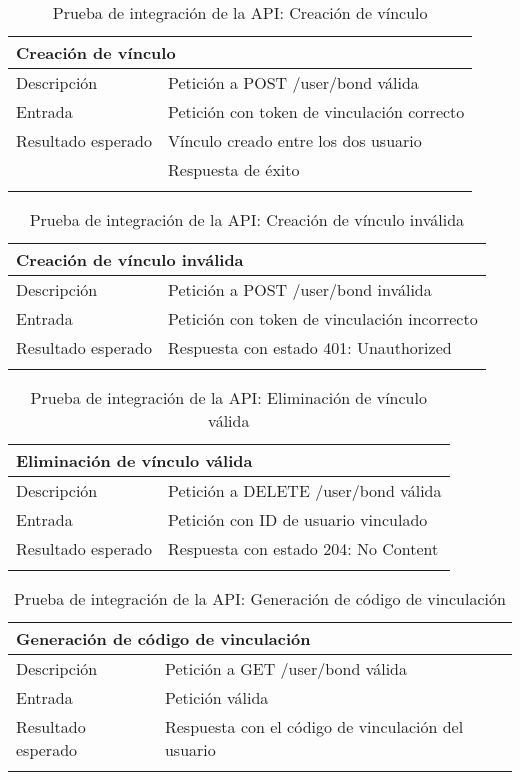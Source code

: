 \begin{longtable}{|p{} p{}|}
    \hline
    \multicolumn{2}{|l|}{\textbf{Creación de vínculo}} \\ \hline 
    Descripción                 & Petición a POST /user/bond válida \\ \hline
    Entrada                     & Petición con token de vinculación correcto \\  \hline
    Resultado esperado          & Vínculo creado entre los dos usuario \\
                                & Respuesta de éxito \\ \hline
    \caption{Prueba de integración de la API: Creación de vínculo}
    \label{cp:i:api:creacion_vinculo}
\end{longtable}

\begin{longtable}{|p{} p{}|}
    \hline
    \multicolumn{2}{|l|}{\textbf{Creación de vínculo inválida}} \\ \hline 
    Descripción                 & Petición a POST /user/bond inválida \\ \hline
    Entrada                     & Petición con token de vinculación incorrecto \\  \hline
    Resultado esperado          & Respuesta con estado 401: Unauthorized \\ \hline
    \caption{Prueba de integración de la API: Creación de vínculo inválida}
    \label{cp:i:api:creacion_vinculo_invalida}
\end{longtable}

\begin{longtable}{|p{} p{}|}
    \hline
    \multicolumn{2}{|l|}{\textbf{Eliminación de vínculo válida}} \\ \hline 
    Descripción                 & Petición a DELETE /user/bond válida \\ \hline
    Entrada                     & Petición con ID de usuario vinculado \\  \hline
    Resultado esperado          & Respuesta con estado 204: No Content \\ \hline
    \caption{Prueba de integración de la API: Eliminación de vínculo válida}
    \label{cp:i:api:eliminacion_vinculo_valida}
\end{longtable}

\begin{longtable}{|p{} p{}|}
    \hline
    \multicolumn{2}{|l|}{\textbf{Generación de código de vinculación}} \\ \hline 
    Descripción                 & Petición a GET /user/bond válida \\ \hline
    Entrada                     & Petición válida \\  \hline
    Resultado esperado          & Respuesta con el código de vinculación del usuario \\ \hline
    \caption{Prueba de integración de la API: Generación de código de vinculación}
    \label{cp:i:api:generacion_codigo_vinculacion}
\end{longtable}

